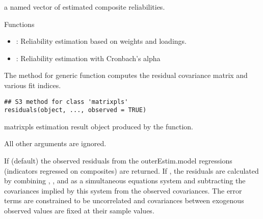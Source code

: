 \documentclass[a4paper]{book}
\begin{document}
%
\begin{Value}
a named vector of estimated composite reliabilities.
\end{Value}
%
\begin{Section}{Functions}
\begin{itemize}

\item{} : Reliability estimation based on weights and loadings.

\item{} : Reliability estimation with Cronbach's alpha

\end{itemize}
\end{Section}
%
\begin{Description}\relax
The  method for generic function  computes the residual
covariance matrix and various fit indices.
\end{Description}
%
\begin{Usage}
\begin{verbatim}
## S3 method for class 'matrixpls'
residuals(object, ..., observed = TRUE)
\end{verbatim}
\end{Usage}
%
\begin{Arguments}
\begin{ldescription}
\item[\code{object}] matrixpls estimation result object produced by the  function.

\item[\code{...}] All other arguments are ignored.

\item[\code{observed}] If  (default) the observed residuals from the outerEstim.model regressions
(indicators regressed on composites) are returned. If , the residuals are calculated
by combining  , , and  as a simultaneous equations
system and subtracting the covariances implied by this system from the observed covariances.
The error terms are constrained to be uncorrelated and covariances between exogenous observed
values are fixed at their sample values.
\end{ldescription}
\end{Arguments}
\end{document}
